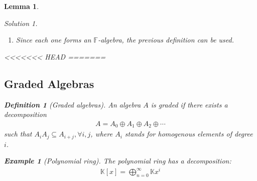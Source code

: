 \documentclass{article}
\newtheorem{Lemma}{Lemma}
\theoremstyle{definition}
\newtheorem{Definition}{Definition}
\newtheorem*{Example*}{Example}
\theoremstyle{remark}
\newtheorem*{Solution*}{Solution}
\theoremstyle{underline}
\theoremstyle{underline}
\begin{document}
\begin{Lemma}
\begin{Solution*}
\begin{enumerate}[label=(\alph*)]
			Define a map $M_{n \times n} (\mathbb F) \otimes A \to M_{n \times n}(A)$, $\sum\limits_k \Lambda_k \otimes a_k \mapsto \sum\limits_k \Lambda_k a_k$, where $\Lambda_k = \bqty{\lambda^{(k)}_{ij}}$ is a matrix in $M_{n \times n}(\mathbb F)$ and $a_k \in A$ for each $k$. This map is obviously a linear transformation, and since $\pqty{\sum\limits_k \Lambda_k \otimes a_k}\pqty{\sum\limits_l \Gamma_l \otimes b_l} = \sum\limits_{k, l} \Lambda_k \Gamma_l \otimes a_k b_l \mapsto \sum\limits_{k, l} \Lambda_k \Gamma_l a_k b_l$, it is an algebra homomorphism as well. If the kernel is trivial, then this is an isomorphism. Therefore, consider $\sum\limits_k \Lambda_k \otimes a_k \mapsto \sum\limits_k \Lambda_k a_k = 0$. Then, for each $i$, $j$, we have $\sum\limits_k \lambda^{(k)}_{ij} a_k = 0$. Let $E_{ij}$ be the $n \times n$ $\mathbb F$-matrix with $(i,j)$-entry $1$ and all other entries $0$. Then,
			\begin{align*}
				\sum_k \Lambda_k \otimes a_k & = \sum_k \pqty{\sum_{i,j} \lambda^{(k)}_{ij} E_{ij}} \otimes a_k\\
					& = \sum_{i,j} E_{ij} \otimes \pqty{\sum_k \lambda^{(k)}_{ij} a_k}\\
					& = \sum_{i, j} E_{ij} \otimes 0\\
					& = 0.
			\end{align*}
			Thus, the kernel is trivial and the mapping is an isomorphism of algebras.
			\item Since each one forms an $\mathbb F$-algebra, the previous definition can be used.
		\end{enumerate}
	\end{Solution*}

<<<<<<< HEAD
=======
	\subsection{Graded Algebras}

	\begin{Definition}[Graded algebras]
		An algebra $A$ is \emph{graded} if there exists a decomposition
		\begin{gather*}
			A = A_0 \oplus A_1 \oplus A_2 \oplus \cdots
		\end{gather*}
		such that $A_i A_j \subseteq A_{i+j}, \forall i,j$, where $A_i$ stands for homogenous elements of degree $i$.
	\end{Definition}

	\begin{Example*}[Polynomial ring]
		The polynomial ring has a decomposition:
		\begin{gather*}
			\mathbb K[x] = \bigoplus_{n=0}^{\infty} \mathbb K x^i
		\end{gather*}
	\end{Example*}


\end{Lemma}
\end{document}
